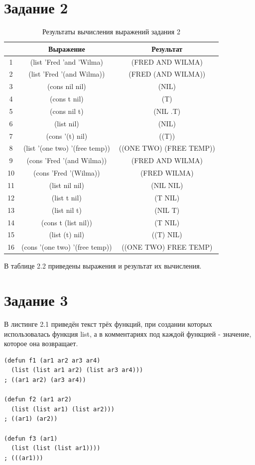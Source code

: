 \section{Задание 2}
\begin{table}[H]
    \centering
    \caption{Результаты вычисления выражений задания \No{}2}
	\begin{tabular}{|c|c|c|}
 	\hline
    \No{} & Выражение & Результат \\
 	\hline
    1 & (list 'Fred 'and 'Wilma) & (FRED AND WILMA) \\
 	\hline
    2 & (list 'Fred '(and Wilma)) & (FRED (AND WILMA))\\
 	\hline
    3 & (cons nil nil) & (NIL) \\
 	\hline
    4 & (cons t nil) & (T) \\
 	\hline
    5 & (cons nil t) & (NIL .T)\\
 	\hline
    6 & (list nil) & (NIL) \\
 	\hline
    7 & (cons '(t) nil) & ((T)) \\
 	\hline
    8 & (list '(one two) '(free temp)) & ((ONE TWO) (FREE TEMP)) \\
 	\hline
    9 & (cons 'Fred '(and Wilma)) & (FRED AND WILMA) \\
 	\hline
    10 & (cons 'Fred '(Wilma)) & (FRED WILMA) \\
 	\hline
    11 & (list nil nil) & (NIL NIL) \\
 	\hline
    12 & (list t nil) & (T NIL) \\
 	\hline
    13 & (list nil t) & (NIL T) \\
 	\hline
    14 & (cons t (list nil)) & (T NIL) \\
 	\hline
    15 & (list (t) nil) & ((T) NIL) \\
 	\hline
    16 & (cons '(one two) '(free temp)) & ((ONE TWO) FREE TEMP) \\
 	\hline
	\end{tabular}
\end{table}
В таблице 2.2 приведены выражения и результат их вычисления.

\section{Задание 3}
В листинге 2.1 приведён текст трёх функций, при создании которых использовалась функция list, а в комментариях под каждой функцией - значение, которое она возвращает.

\lstset{language=lisp}
\begin{lstlisting}[caption={Примеры функций с использованием функции list}]
(defun f1 (ar1 ar2 ar3 ar4)
  (list (list ar1 ar2) (list ar3 ar4)))
; ((ar1 ar2) (ar3 ar4))

(defun f2 (ar1 ar2)
  (list (list ar1) (list ar2)))
; ((ar1) (ar2))

(defun f3 (ar1)
  (list (list (list ar1))))
; (((ar1)))
\end{lstlisting}


